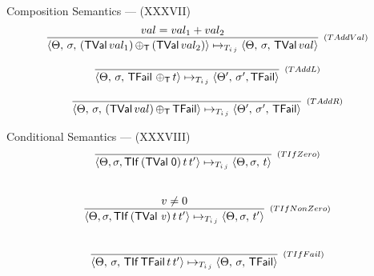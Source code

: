 \documentclass[14pt]{beamer}
\newcommand{\C}[1]{\red{\mathsf{#1}}}
\newcommand{\V}[1]{\purple{\mathit{#1}}}
\begin{document}
     \begin{frame}{Composition Semantics --- (XXXVII)}
\begingroup
\everymath{\scriptstyle}
\large
\[
\begin{array}{c}
  \infer[_{(TAddVal)}]
        { \langle \Theta, \, \sigma,\, (\ensuremath{\C{TVal}}\,val_1) \ensuremath{\C{\,\oplus_T\,}} (\ensuremath{\C{TVal}}\,val_2) \rangle \mapsto_{T_{i\,j}}
          \langle \Theta, \, \sigma,\, \ensuremath{\C{TVal}}\,val \rangle}
        {val = val_1 + val_2}
  \\ \\
  \infer[_{(TAddL)}]
        { \langle \Theta,\,\sigma,\,\ensuremath{\C{TFail}}\,\ensuremath{\C{\,\oplus_T\,}} t\rangle \mapsto_{T_{i\,j}}
          \langle \Theta',\,\sigma', \ensuremath{\C{TFail}}\rangle}
        { }


  \\ \\
  \infer[_{(TAddR)}]
        { \langle \Theta,\,\sigma,\, (\ensuremath{\C{TVal}}\, val) \ensuremath{\C{\,\oplus_T\,}} \ensuremath{\C{TFail}} \rangle \mapsto_{T_{i\,j}}
          \langle \Theta',\,\sigma',\,\ensuremath{\C{TFail}} \rangle }
        { }
\end{array}
\]
\endgroup
     \end{frame}
     \begin{frame}{Conditional Semantics --- (XXXVIII)}
\[
  \begin{array}{c}
     \infer[_{(TIfZero)}]
           {\langle \Theta,\sigma,\ensuremath{\C{TIf}}\,(\ensuremath{\C{TVal}\;\C{0}})\,t\,t'\rangle \mapsto_{T_{i\,j}}
            \langle \Theta,\sigma,\,t\rangle}
           {}
     \\ \\ \\
     \infer[_{(TIfNonZero)}]
           {\langle \Theta,\sigma,\ensuremath{\C{TIf}}\,(\ensuremath{\C{TVal}\;\V{v}})\,t\,t'\rangle \mapsto_{T_{i\,j}}
            \langle \Theta,\sigma,\,t'\rangle}
           {v \neq 0}    \\ \\ \\
     \infer[_{(TIfFail)}]
           { \langle \Theta,\,\sigma,\,\ensuremath{\C{TIf}}\,\ensuremath{\C{TFail}}\,t\,t'\rangle\mapsto_{T_{i\,j}}
             \langle \Theta,\,\sigma,\,\ensuremath{\C{TFail}}\rangle }
           {}

  \end{array}
\]
     \end{frame}
\end{document}

